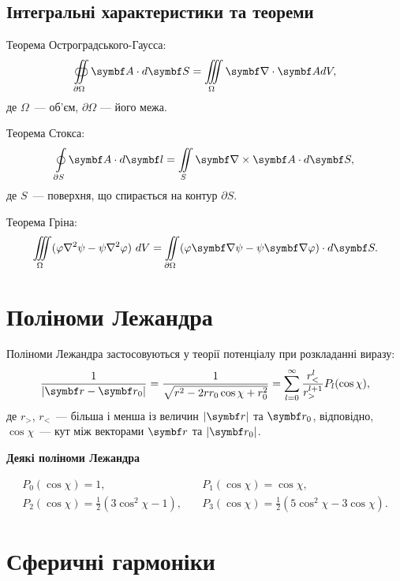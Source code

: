 \subsection{Інтегральні характеристики та теореми}

Теорема Остроградського-Гаусса:
\begin{equation}\label{OGTheorem}
	\oiint\limits_{\partial \Omega} \vect{A}\cdot d\vect{S} = \iiint\limits_{\Omega} \divg\vect{A} dV,
\end{equation}
де $\Omega$~--- об'єм, $\partial\Omega$ --- його межа.

Теорема Стокса:
\begin{equation}\label{Stoksheorem}
	\oint\limits_{\partial S} \vect{A}\cdot d\vect{l} = \iint\limits_S \rot\vect{A} \cdot d\vect{S},
\end{equation}
де $S$~--- поверхня, що спирається на контур $\partial S$.

Теорема Гріна:
\begin{equation}\label{Grin}
	\iiint\limits_{\Omega}(\phi \nabla ^{2}\psi -\psi \nabla ^{2}\phi )\ dV=\iint \limits_{\partial \Omega}(\phi \vect{\nabla} \psi -\psi \vect{\nabla}
	\phi )\cdot d\vect{S}.
\end{equation}


\section{Поліноми Лежандра}\label{Polinoms}

Поліноми Лежандра застосовуються у теорії потенціалу при розкладанні виразу:%
\begin{equation*}\label{}
    \frac{1}{|\vect{r} - \vect{r}_0|} = \frac{1}{\sqrt{r^2 - 2rr_0 \cos\chi + r_0^2 }}  =  \sum\limits_{l = 0}^{\infty} \frac{r^l_<}{r^{l+1}_>} P_l(\cos\chi),
\end{equation*}
де $r_>$, $r_<$~--- більша і менша із величин $|\vect{r}|$ та $\vect{r}_0$, відповідно, $\cos\chi$~--- кут між векторами $\vect{r}$ та $|\vect{r}_0|$.

\medskip%
\textbf{Деякі поліноми Лежандра}

\begin{align*}
P_{0}(\cos\chi)  = 1, &\quad P_{1}(\cos\chi)  = \cos\chi, \\
P_{2}(\cos\chi)  = \frac {1}{2}(3\cos^2\chi-1), &\quad P_{3}(\cos\chi)  = \frac {1}{2}(5\cos^2\chi-3\cos\chi).
\end{align*}


\section{Сферичні гармоніки}\label{Spherical_Harmonics}

